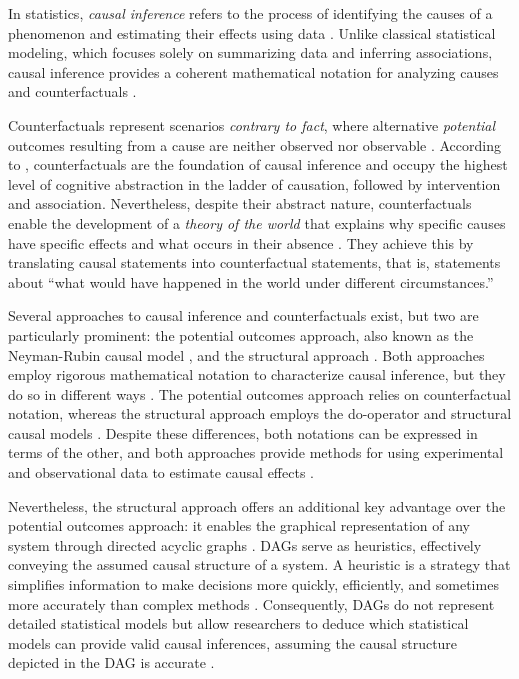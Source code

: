 \documentclass[
  authoryear,
  preprint,
  1p]{elsarticle}
\begin{document}
In statistics, \emph{causal inference} refers to the process of
identifying the causes of a phenomenon and estimating their effects
using data \citep{Shaughnessy_et_al_2010, Neal_2020}. Unlike classical
statistical modeling, which focuses solely on summarizing data and
inferring associations, causal inference provides a coherent
mathematical notation for analyzing causes and counterfactuals
\citep{Pearl_2009}.

Counterfactuals represent scenarios \emph{contrary to fact}, where
alternative \emph{potential} outcomes resulting from a cause are neither
observed nor observable \citep{Neal_2020, Counterfactual_2024}.
According to \citet{Pearl_et_al_2018}, counterfactuals are the
foundation of causal inference and occupy the highest level of cognitive
abstraction in the ladder of causation, followed by intervention and
association. Nevertheless, despite their abstract nature,
counterfactuals enable the development of a \emph{theory of the world}
that explains why specific causes have specific effects and what occurs
in their absence \citep{Pearl_et_al_2018}. They achieve this by
translating causal statements into counterfactual statements, that is,
statements about ``what would have happened in the world under different
circumstances.''

Several approaches to causal inference and counterfactuals exist, but
two are particularly prominent: the potential outcomes approach, also
known as the Neyman-Rubin causal model
\citep{Neyman_et_al_1923, Rubin_1974}, and the structural approach
\citep{Pearl_2009, Pearl_et_al_2016}. Both approaches employ rigorous
mathematical notation to characterize causal inference, but they do so
in different ways \citep{Neal_2020}. The potential outcomes approach
relies on counterfactual notation, whereas the structural approach
employs the do-operator and structural causal models
\citep[SCM,][]{Pearl_2009, Pearl_et_al_2016}. Despite these differences,
both notations can be expressed in terms of the other, and both
approaches provide methods for using experimental and observational data
to estimate causal effects \citep{Pearl_2010}.

Nevertheless, the structural approach offers an additional key advantage
over the potential outcomes approach: it enables the graphical
representation of any system through directed acyclic graphs
\citep[DAG,][]{Gross_et_al_2018, Neal_2020}. DAGs serve as heuristics,
effectively conveying the assumed causal structure of a system. A
heuristic is a strategy that simplifies information to make decisions
more quickly, efficiently, and sometimes more accurately than complex
methods \citep{Chow_2015}. Consequently, DAGs do not represent detailed
statistical models but allow researchers to deduce which statistical
models can provide valid causal inferences, assuming the causal
structure depicted in the DAG is accurate \citep{McElreath_2020}.
\end{document}

